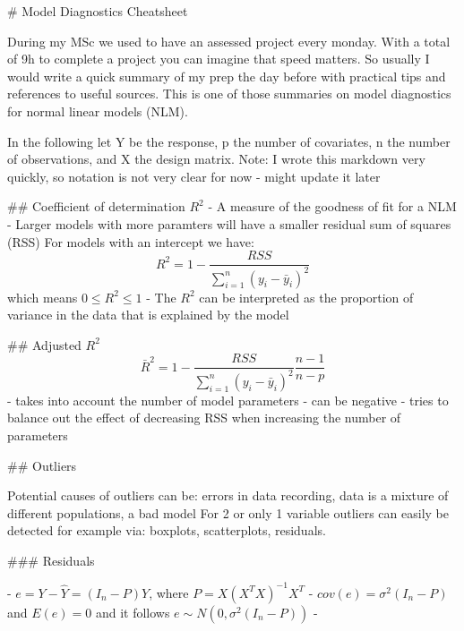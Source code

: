 # Model Diagnostics Cheatsheet

During my MSc we used to have an assessed project every monday. With a total of 9h to complete a project you can imagine that speed matters. 
So usually I would write a quick summary of my prep the day before with practical tips and references to useful sources. 
This is one of those summaries on model diagnostics for normal linear models (NLM).

In the following let Y be the response, p the number of covariates, n the number of observations, and X the design matrix. 
Note: I wrote this markdown very quickly, so notation is not very clear for now - might update it later

## Coefficient of determination $R^2$
- A measure of the goodness of fit for a NLM
- Larger models with more paramters will have a smaller residual sum of squares (RSS)
For models with an intercept we have: $$R^2 = 1 - \frac{RSS}{\sum_{i=1}^n (y_i-\bar{y}_i)^2}$$
which means $0 \leq R^2 \leq 1$
- The $R^2$ can be interpreted as the proportion of variance in the data that is explained by the model

## Adjusted $R^2$
$$\bar{R}^2 = 1 - \frac{RSS}{\sum_{i=1}^n (y_i-\bar{y}_i)^2} \frac{n-1}{n-p}$$
- takes into account the number of model parameters
- can be negative
- tries to balance out the effect of decreasing RSS when increasing the number of parameters

## Outliers

Potential causes of outliers can be: errors in data recording, data is a mixture of different populations, a bad model
For 2 or only 1 variable outliers can easily be detected for example via: boxplots, scatterplots, residuals.

### Residuals

- $e = Y-\hat{Y} = (I_n - P)Y$, where $P=X(X^TX)^{-1}X^T$
- $cov(e) = \sigma^2(I_n-P)$ and $E(e)=0$ and it follows $e\sim N(0,\sigma^2(I_n-P))$
- 
